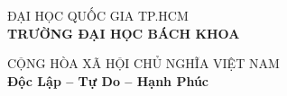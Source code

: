 \documentclass[13pt,a4paper,oneside]{extbook}
\begin{document}

\coverpage
\thispagestyle{empty}

\noindent
\begin{minipage}[t]{0.45\textwidth}
    ĐẠI HỌC QUỐC GIA TP.HCM \\
    \textbf{TRƯỜNG ĐẠI HỌC BÁCH KHOA}
\end{minipage}%
\hfill
\begin{minipage}[t]{0.50\textwidth}
    \raggedleft
    CỘNG HÒA XÃ HỘI CHỦ NGHĨA VIỆT NAM \\
    \textbf{Độc Lập -- Tự Do -- Hạnh Phúc}
\end{minipage}

\vspace{0.3cm}
\end{document}
